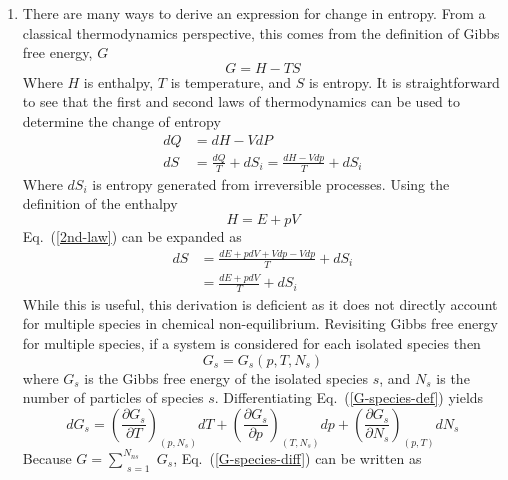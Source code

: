 \documentclass[a4paper]{article}
\newcommand{\eref}[1]{Eq.~(\ref{#1})}
\begin{document}
\begin{enumerate}
  \item There are many ways to derive an expression for change in entropy.  From
    a classical thermodynamics perspective, this comes from the definition of
    Gibbs free energy, $G$
    \begin{equation}
      G = H - TS
      \label{gfe-def}
    \end{equation}
    Where $H$ is enthalpy, $T$ is temperature, and $S$ is entropy.  It is
    straightforward to see that the first and second laws of thermodynamics can
    be used to determine the change of entropy
    \begin{align}
      dQ &= dH - VdP \label{1st-law}\\
      dS &= \frac{dQ}{T} + dS_{i}= \frac{dH - Vdp}{T} + dS_{i}
      \label{2nd-law}
    \end{align}
    Where $dS_i$ is entropy generated from irreversible processes. Using the
    definition of the enthalpy \begin{equation}
      H = E + pV
      \label{enthalpy-def}
    \end{equation}
    \eref{2nd-law} can be expanded as
    \begin{equation}
      \begin{aligned}
	      dS &= \frac{dE + pdV + Vdp - Vdp}{T} + dS_i\\
	         &= \frac{dE + pdV}{T} + dS_i
      \end{aligned}
      \label{s-one-gas}
    \end{equation}
    While this is useful, this derivation is deficient as it does not directly
    account for multiple species in chemical non-equilibrium.  Revisiting Gibbs
    free energy for multiple species, if a system is considered for each
    isolated species then
    \begin{equation}
      G_s = G_s(p,T,N_s)
      \label{G-species-def}
    \end{equation}
    where $G_s$ is the Gibbs free energy of the isolated species $s$, and $N_s$
    is the number of particles of species $s$. Differentiating
    \eref{G-species-def} yields
    \begin{equation}
      dG_s = \left( \frac{\partial G_s}{\partial T} \right)_{(p,N_s)} dT
      + \left( \frac{\partial G_s}{\partial p} \right)_{(T,N_s)} dp
      + \left( \frac{\partial G_s}{\partial N_s} \right)_{(p,T)} dN_s
      \label{G-species-diff}
    \end{equation}
    Because $G = \sum\limits_{\substack{s=1}}^{N_{ns}}{G_s}$,
    \eref{G-species-diff} can be written as

\end{enumerate}
\end{document}
